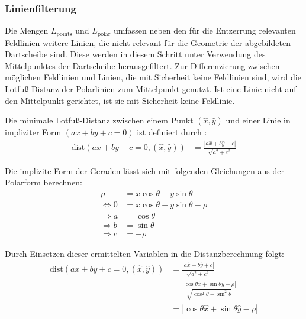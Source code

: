 
\subsubsection{Linienfilterung}
\label{sec:linienfilterung}

Die Mengen $L_\text{points}$ und $L_\text{polar}$ umfassen neben den für die Entzerrung relevanten Feldlinien weitere Linien, die nicht relevant für die Geometrie der abgebildeten Dartscheibe sind. Diese werden in diesem Schritt unter Verwendung des Mittelpunktes der Dartscheibe herausgefiltert. Zur Differenzierung zwischen möglichen Feldlinien und Linien, die mit Sicherheit keine Feldlinien sind, wird die Lotfuß-Distanz der Polarlinien zum Mittelpunkt genutzt. Ist eine Linie nicht auf den Mittelpunkt gerichtet, ist sie mit Sicherheit keine Feldlinie.

Die minimale Lotfuß-Distanz zwischen einem Punkt $(\hat{x}, \hat{y})$ und einer Linie in impliziter Form $(ax + by + c = 0)$ ist definiert durch \cite{point_line_distance}:
\begin{align*}
    \text{dist}(ax + by + c = 0, (\hat{x}, \hat{y})) & = \frac{| a \hat{x} + b \hat{y} + c|}{\sqrt{a^2+c^2}}
\end{align*}

Die implizite Form der Geraden lässt sich mit folgenden Gleichungen aus der Polarform berechnen:
\begin{align*}
    \rho          & = x \cos{\theta} + y \sin{\theta}        \\
    \iff 0        & = x \cos{\theta} + y \sin{\theta} - \rho \\
    \Rightarrow a & = \cos{\theta}                           \\
    \Rightarrow b & = \sin{\theta}                           \\
    \Rightarrow c & = -\rho
\end{align*}

Durch Einsetzen dieser ermittelten Variablen in die Distanzberechnung folgt:
\begin{align*}
    \text{dist}(ax + by + c = 0, (\hat{x}, \hat{y})) & = \frac{| a \hat{x} + b \hat{y} + c|}{\sqrt{a^2+c^2}}                                                   \\
                                                     & = \frac{| \cos{\theta} \hat{x} + \sin{\theta} \hat{y} - \rho |}{\sqrt{\cos^2{\theta} + \sin^2{\theta}}} \\
                                                     & = | \cos{\theta} \hat{x} + \sin{\theta} \hat{y} - \rho |
\end{align*}


